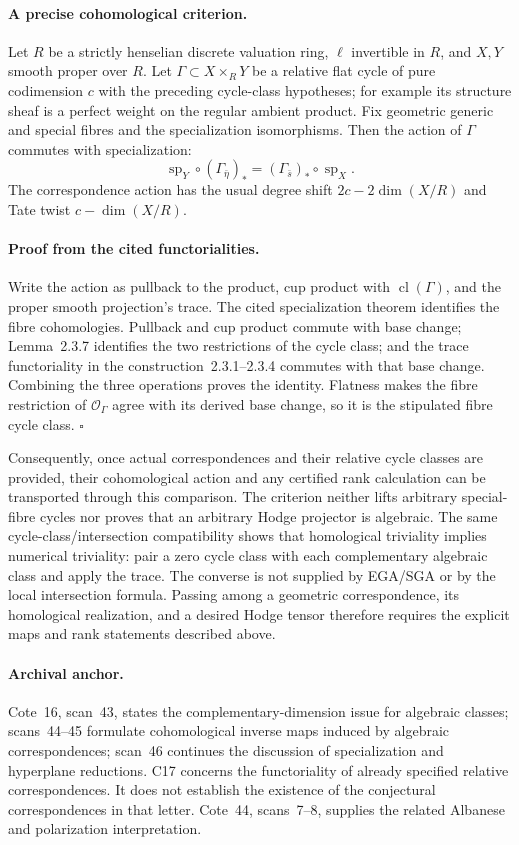 \documentclass[11pt]{article}
\theoremstyle{definition}\newtheorem{definition}[theorem]{Definition}\newtheorem{remark}[theorem]{Remark}
\begin{document}
\paragraph{A precise cohomological criterion.}
Let $R$ be a strictly henselian discrete valuation ring,
$\ell$ invertible in $R$, and $X,Y$ smooth proper over $R$.
Let $\Gamma\subset X\times_RY$ be a relative flat cycle of pure
codimension $c$ with the preceding cycle-class hypotheses; for
example its structure sheaf is a perfect weight on the regular
ambient product. Fix geometric generic and special fibres and the
specialization isomorphisms. Then the action of $\Gamma$ commutes
with specialization:
\[
 \operatorname{sp}_Y\circ(\Gamma_{\bar\eta})_*
       =(\Gamma_{\bar s})_*\circ\operatorname{sp}_X.
\]
The correspondence action has the usual degree shift
$2c-2\dim(X/R)$ and Tate twist $c-\dim(X/R)$.

\paragraph{Proof from the cited functorialities.}
Write the action as pullback to the product, cup product with
$\operatorname{cl}(\Gamma)$, and the proper smooth projection's
trace. The cited specialization theorem identifies the fibre
cohomologies. Pullback and cup product commute with base change;
Lemma~2.3.7 identifies the two restrictions of the cycle class;
and the trace functoriality in the construction~2.3.1--2.3.4
commutes with that base change. Combining the three operations
proves the identity. Flatness makes the fibre restriction of
$\mathcal O_\Gamma$ agree with its derived base change, so it is
the stipulated fibre cycle class. $\square$

Consequently, once actual correspondences and their relative cycle
classes are provided, their cohomological action and any certified
rank calculation can be transported through this comparison. The
criterion neither lifts arbitrary special-fibre cycles nor proves
that an arbitrary Hodge projector is algebraic. The same
cycle-class/intersection compatibility shows that homological
triviality implies numerical triviality: pair a zero cycle class
with each complementary algebraic class and apply the trace.
The converse is not supplied by EGA/SGA or by the local
intersection formula. Passing among a geometric correspondence,
its homological realization, and a desired Hodge tensor therefore
requires the explicit maps and rank statements described above.

\paragraph{Archival anchor.}
Cote~16, scan~43, states the complementary-dimension issue for algebraic
classes; scans~44--45 formulate cohomological inverse maps induced by
algebraic correspondences; scan~46 continues the discussion of
specialization and hyperplane reductions.  C17 concerns the functoriality
of already specified relative correspondences.  It does not establish the
existence of the conjectural correspondences in that letter.  Cote~44,
scans~7--8, supplies the related Albanese and polarization interpretation.
\end{document}
